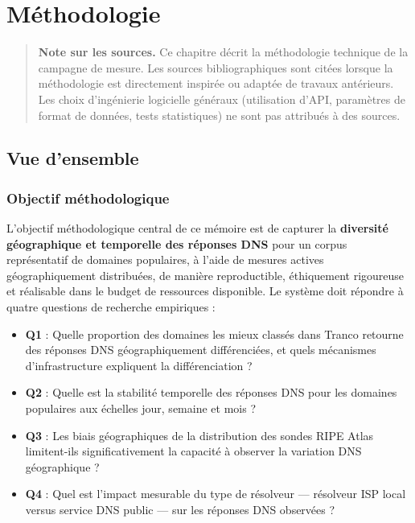 
\chapter{Méthodologie}

\begin{quote}
\textbf{Note sur les sources.} Ce chapitre décrit la méthodologie technique de la campagne de mesure. Les sources bibliographiques sont citées lorsque la méthodologie est directement inspirée ou adaptée de travaux antérieurs. Les choix d'ingénierie logicielle généraux (utilisation d'API, paramètres de format de données, tests statistiques) ne sont pas attribués à des sources.
\end{quote}
\bigskip
\section{Vue d'ensemble}
\label{sec:3.1}

\subsection{Objectif méthodologique}
\label{subsec:3.1.1}

L'objectif méthodologique central de ce mémoire est de capturer la \textbf{diversité géographique et temporelle des réponses DNS} pour un corpus représentatif de domaines populaires, à l'aide de mesures actives géographiquement distribuées, de manière reproductible, éthiquement rigoureuse et réalisable dans le budget de ressources disponible. Le système doit répondre à quatre questions de recherche empiriques :

\begin{itemize}
  \item \textbf{Q1} : Quelle proportion des domaines les mieux classés dans Tranco retourne des réponses DNS géographiquement différenciées, et quels mécanismes d'infrastructure expliquent la différenciation ?
  \item \textbf{Q2} : Quelle est la stabilité temporelle des réponses DNS pour les domaines populaires aux échelles jour, semaine et mois ?
  \item \textbf{Q3} : Les biais géographiques de la distribution des sondes RIPE Atlas limitent-ils significativement la capacité à observer la variation DNS géographique ?
  \item \textbf{Q4} : Quel est l'impact mesurable du type de résolveur --- résolveur ISP local versus service DNS public --- sur les réponses DNS observées ?
\end{itemize}

